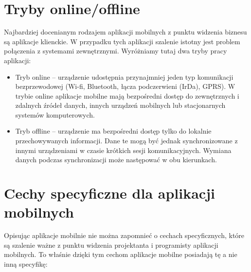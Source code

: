 \section{Tryby online/offline}
\label{sec:trybyAplikacjiMobilnych}
Najbardziej docenianym rodzajem aplikacji mobilnych z punktu widzenia biznesu są aplikacje klienckie. W przypadku tych aplikacji szalenie istotny jest problem połączenia z systemami zewnętrznymi. Wyróżniamy tutaj dwa tryby pracy aplikacji:

\begin{itemize}
\item Tryb online -- urządzenie udostępnia przynajmniej jeden typ komunikacji bezprzewodowej (Wi-fi, Bluetooth, łącza podczerwieni (IrDa), GPRS). W trybie online aplikacje mobilne mają bezpośredni dostęp do zewnętrznych i zdalnych źródeł danych, innych urządzeń mobilnych lub stacjonarnych systemów komputerowych.   
\item Tryb offline -- urządzenie ma bezpośredni dostęp tylko do lokalnie przechowywanych informacji. Dane te mogą być jednak synchronizowane z innymi urządzeniami w czasie krótkich sesji komunikacyjnych. Wymiana danych podczas synchronizacji może następować w obu kierunkach. 
\end{itemize}

\section{Cechy specyficzne dla aplikacji mobilnych }
\label{sec:cechyAplikacjiMobilnych}
Opisując aplikacje mobilnie nie można zapomnieć o cechach specyficznych, które są szalenie ważne z punktu widzenia projektanta i programisty aplikacji mobilnych. To właśnie dzięki tym cechom aplikacje mobilne posiadają tę a nie inną specyfikę:

